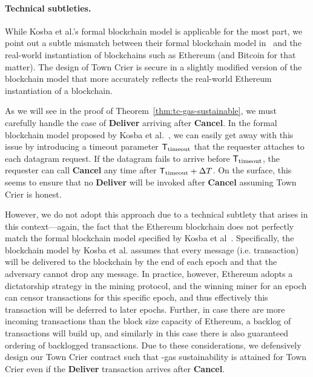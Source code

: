 \newcommand{\Ttimeout}{\ensuremath{{\sf T}_{\text{timeout}}}\xspace}

\paragraph{Technical subtleties.}
While Kosba et al.'s formal blockchain model is applicable for the most part,
we point out a subtle mismatch
between their formal blockchain model in~\cite{hawk} and
the real-world instantiation of blockchains such as 
Ethereum (and Bitcoin for that matter).
The design of Town Crier is secure in a slightly modified
version of the blockchain model that more accurately reflects
the real-world Ethereum instantiation of a blockchain.


As we will see in the proof of Theorem~\ref{thm:tc-gas-sustainable}, we must carefully handle the case of {\bf Deliver} arriving after {\bf Cancel}.
In the formal blockchain model proposed by Kosba et al.~\cite{hawk}, we can easily get away with this issue by introducing a timeout parameter
$\Ttimeout$ that the requester attaches to each datagram request.
If the datagram fails to arrive before $\Ttimeout$, the requester can call {\bf Cancel} any time after $\Ttimeout + \Delta T$.
On the surface, this seems to ensure that no {\bf Deliver} will be invoked after {\bf Cancel} assuming Town Crier is honest.

However, we do not adopt this approach due to a technical subtlety
that arises in this context---again, the fact that  
the Ethereum blockchain does not  
perfectly match the formal blockchain 
model specified by Kosba et al~\cite{hawk}.
Specifically, the blockchain model by Kosba et al.
assumes that every message (i.e. transaction) will be delivered 
to the blockchain 
by the end of each epoch and that the adversary cannot drop
any message.
In practice, however, 
Ethereum adopts a dictatorship 
strategy in the mining protocol, and the winning miner 
for an epoch can censor transactions for this specific epoch, and thus
effectively this transaction will be deferred to later epochs.
Further, in case there are more incoming transactions than the block size
capacity of Ethereum, a backlog of transactions will build up, 
and similarly in this case there is also guaranteed
ordering of backlogged transactions.
Due to these considerations, we defensively design our Town Crier contract
such that \constgasmax-gas sustainability is attained for Town Crier
even if the {\bf Deliver} transaction arrives after {\bf Cancel}.







